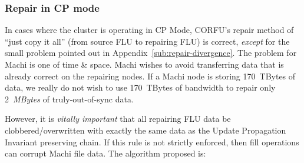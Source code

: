 \documentclass[preprint,10pt]{sigplanconf}
\begin{document}
\subsubsection{Repair in CP mode}

In cases where the cluster is operating in CP Mode,
CORFU's repair method of ``just copy it all'' (from source FLU to repairing
FLU) is correct, {\em except} for the small problem pointed out in
Appendix~\ref{sub:repair-divergence}.  The problem for Machi is one of
time \& space.  Machi wishes to avoid transferring data that is
already correct on the repairing nodes.  If a Machi node is storing
170~TBytes of data, we really do not wish to use 170~TBytes of bandwidth
to repair only 2~{\em MBytes} of truly-out-of-sync data.

However, it is {\em vitally important} that all repairing FLU data be
clobbered/overwritten with exactly the same data as the Update
Propagation Invariant preserving chain.  If this rule is not strictly
enforced, then fill operations can corrupt Machi file data.  The
algorithm proposed is:
\end{document}
